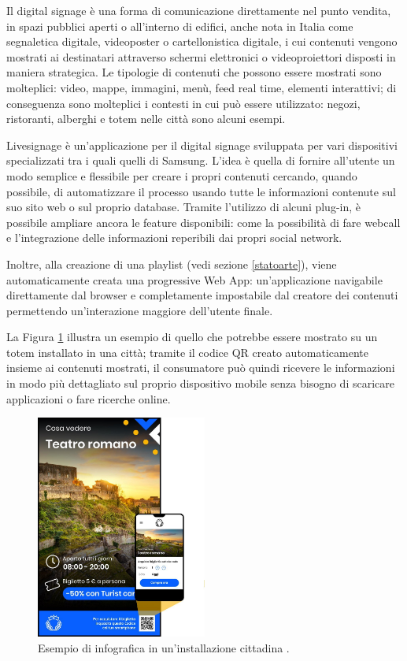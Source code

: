 Il digital signage è una forma di comunicazione direttamente nel punto vendita, in spazi pubblici aperti o all'interno di edifici, anche nota in Italia come segnaletica digitale, videoposter o cartellonistica digitale, i cui contenuti vengono mostrati ai destinatari attraverso schermi elettronici o videoproiettori disposti in maniera strategica. Le tipologie di contenuti che possono essere mostrati sono molteplici: video, mappe, immagini, menù, feed real time, elementi interattivi; di conseguenza sono molteplici i contesti in cui può essere utilizzato: negozi, ristoranti, alberghi e totem nelle città sono alcuni esempi.

Livesignage è un’applicazione per il digital signage sviluppata per vari dispositivi specializzati tra i quali quelli di Samsung. L’idea è quella di fornire all'utente un modo semplice e flessibile per creare i propri contenuti cercando, quando possibile, di automatizzare il processo usando tutte le informazioni contenute sul suo sito web o sul proprio database. Tramite l'utilizzo di alcuni plug-in, è possibile ampliare ancora le feature disponibili: come la possibilità di fare webcall e l'integrazione delle informazioni reperibili dai propri social network.

Inoltre, alla creazione di una playlist (vedi sezione \ref*{statoarte}), viene automaticamente creata una progressive Web App: un'applicazione navigabile direttamente dal browser e completamente impostabile dal creatore dei contenuti permettendo un'interazione maggiore dell'utente finale.

La Figura \ref{fig:liveToursitSample} illustra un esempio di quello che potrebbe essere mostrato su un totem installato in una città; tramite il codice QR creato automaticamente insieme ai contenuti mostrati, il consumatore può quindi ricevere le informazioni in modo più dettagliato sul proprio dispositivo mobile senza bisogno di scaricare applicazioni o fare ricerche online.

\begin{figure}[!htb]
    \centering
    \includegraphics[width= 0.5\textwidth]{images/Introduzione/LiveTurist.jpg} 
    \caption{Esempio di infografica in un'installazione cittadina \cite{LSurl}.} 
    \label{fig:liveToursitSample}
\end{figure}



